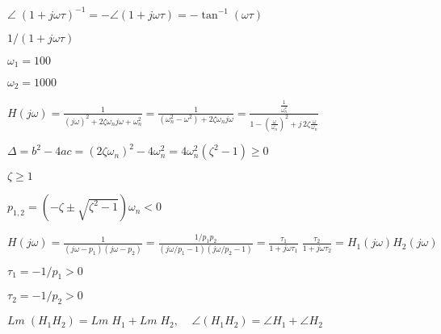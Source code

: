 \documentclass{article}
\def\lthtmlcheckvsize{\ifdim\ht\sizebox<\vsize 
  \ifdim\wd\sizebox<\hsize\expandafter\hfill\fi \expandafter\vfill
  \else\expandafter\vss\fi}%
\begin{document}
{\newpage\clearpage
{}%
$\displaystyle \angle\;(1+j\omega \tau)^{-1}=-\angle(1+j\omega \tau)
=-\tan^{-1}(\omega\tau)$%
\lthtmlindisplaymathZ
\lthtmlcheckvsize\clearpage}

{\newpage\clearpage
{}%
$ 1/(1+j\omega\tau)$%
\lthtmlindisplaymathZ
\lthtmlcheckvsize\clearpage}

{\newpage\clearpage
{}%
$ \omega_1=100$%
\lthtmlindisplaymathZ
\lthtmlcheckvsize\clearpage}

{\newpage\clearpage
{}%
$ \omega_2=1000$%
\lthtmlindisplaymathZ
\lthtmlcheckvsize\clearpage}

{\newpage\clearpage
{}%
$\displaystyle H(j\omega)=\frac{1}{(j\omega)^2+2\zeta\omega_n j\omega+\omega_n^2}
=\frac{1}{(\omega^2_n-\omega^2)+2\zeta\omega_n j\omega}
=\frac{\frac{1}{\omega_n^2}}{1-(\frac{\omega}{\omega_n})^2+j\,2\zeta\frac{\omega}{\omega_n}}$%
\lthtmlindisplaymathZ
\lthtmlcheckvsize\clearpage}

{\newpage\clearpage
{}%
$ \Delta=b^2-4ac=(2\zeta\omega_n)^2-4\omega_n^2=4\omega^2_n(\zeta^2-1)\ge 0$%
\lthtmlindisplaymathZ
\lthtmlcheckvsize\clearpage}

{\newpage\clearpage
{}%
$ \zeta\ge 1$%
\lthtmlindisplaymathZ
\lthtmlcheckvsize\clearpage}

{\newpage\clearpage
{}%
$\displaystyle p_{1,2}=(-\zeta\pm\sqrt{\zeta^2-1})\omega_n < 0$%
\lthtmlindisplaymathZ
\lthtmlcheckvsize\clearpage}

{\newpage\clearpage
{}%
$\displaystyle H(j\omega)=\frac{1}{(j\omega-p_1)(j\omega-p_2)}
=\frac{1/p_1p_2}{(j\omega/p_1-1)(j\omega/p_2-1)}
=\frac{\tau_1}{1+j\omega\tau_1}\;\frac{\tau_2}{1+j\omega\tau_2}
=H_1(j\omega)H_2(j\omega)$%
\lthtmlindisplaymathZ
\lthtmlcheckvsize\clearpage}

{\newpage\clearpage
{}%
$ \tau_1=-1/p_1>0$%
\lthtmlindisplaymathZ
\lthtmlcheckvsize\clearpage}

{\newpage\clearpage
{}%
$ \tau_2=-1/p_2>0$%
\lthtmlindisplaymathZ
\lthtmlcheckvsize\clearpage}

{\newpage\clearpage
{}%
$\displaystyle Lm\;(H_1 H_2)=Lm\; H_1+Lm\; H_2,\;\;\;\;\angle (H_1 H_2)=\angle H_1+\angle H_2$%
\lthtmlindisplaymathZ
\lthtmlcheckvsize\clearpage}
\end{document}
